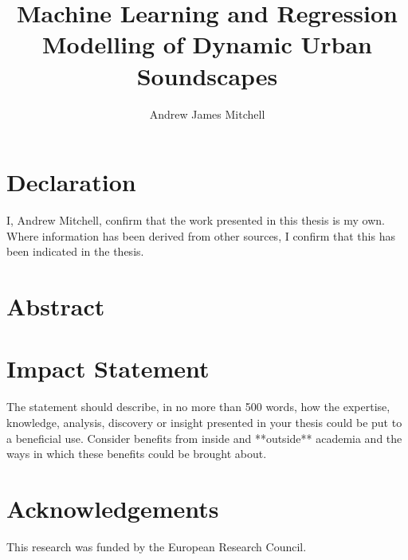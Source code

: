 \documentclass[oneside,fontsize=12pt,titlepage]{scrbook}
\title{Machine Learning and Regression Modelling of Dynamic Urban Soundscapes}
\author{Andrew James Mitchell}
\begin{document}
\begin{titlepage}
    \AddToShipoutPicture*{}
    \maketitle
\end{titlepage}


\restoregeometry


\chapter*{Declaration}
I, Andrew Mitchell, confirm that the work presented in this thesis is my own. Where information has been derived from other sources, I confirm that this has been indicated in the thesis.

\chapter*{Abstract}


\chapter*{Impact Statement}
The statement should describe, in no more than 500 words, how the expertise, knowledge, analysis, discovery or insight presented in your thesis could be put to a beneficial use. Consider benefits from inside and **outside** academia and the ways in which these benefits could be brought about.

\chapter*{Acknowledgements}
This research was funded by the European Research Council.

\end{document}
